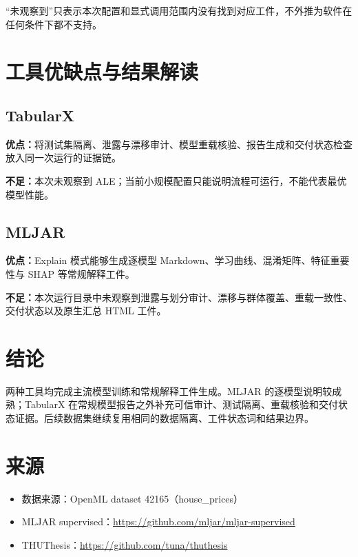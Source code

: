 \documentclass[degree=bachelor,language=chinese,fontset=fandol]{thuthesis}
\begin{document}
“未观察到”只表示本次配置和显式调用范围内没有找到对应工件，不外推为软件在任何条件下都不支持。

\chapter{工具优缺点与结果解读}
\section{TabularX}
\textbf{优点：}将测试集隔离、泄露与漂移审计、模型重载核验、报告生成和交付状态检查放入同一次运行的证据链。

\textbf{不足：}本次未观察到 ALE；当前小规模配置只能说明流程可运行，不能代表最优模型性能。

\section{MLJAR}
\textbf{优点：}Explain 模式能够生成逐模型 Markdown、学习曲线、混淆矩阵、特征重要性与 SHAP 等常规解释工件。

\textbf{不足：}本次运行目录中未观察到泄露与划分审计、漂移与群体覆盖、重载一致性、交付状态以及原生汇总 HTML 工件。

\chapter{结论}
两种工具均完成主流模型训练和常规解释工件生成。MLJAR 的逐模型说明较成熟；TabularX 在常规模型报告之外补充可信审计、测试隔离、重载核验和交付状态证据。后续数据集继续复用相同的数据隔离、工件状态词和结果边界。

\backmatter
\chapter{来源}
\begin{itemize}
  \item 数据来源：OpenML dataset 42165（house\_prices）
  \item MLJAR supervised：\url{https://github.com/mljar/mljar-supervised}
  \item THUThesis：\url{https://github.com/tuna/thuthesis}
\end{itemize}
\end{document}
